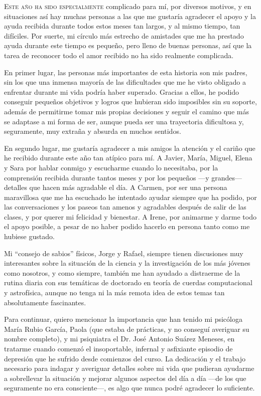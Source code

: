 \lettrine{E}{ste año ha sido especialmente} complicado para mí, por diversos motivos, y en situaciones así hay muchas personas a las que me gustaría agradecer el apoyo y la ayuda recibida durante todos estos meses tan largos, y al mismo tiempo, tan difíciles. Por suerte, mi círculo más estrecho de amistades que me ha prestado ayuda durante este tiempo es pequeño, pero lleno de buenas personas, así que la tarea de reconocer todo el amor recibido no ha sido realmente complicada. 

En primer lugar, las personas más importantes de esta historia son mis padres, sin los que una inmensa mayoría de las dificultades que me he visto obligado a enfrentar durante mi vida podría haber superado. Gracias a ellos, he podido conseguir pequeños objetivos y logros que hubieran sido imposibles sin su soporte, además de permitirme tomar mis propias decisiones y seguir el camino que más se adaptase a mi forma de ser, aunque pueda ser una trayectoria dificultosa y, seguramente, muy extraña y absurda en muchos sentidos.

En segundo lugar, me gustaría agradecer a mis amigos la atención y el cariño que he recibido durante este año tan atípico para mí. A Javier, María, Miguel, Elena y Sara por hablar conmigo y escucharme cuando lo necesitaba, por la comprensión recibida durante tantos meses y por los pequeños ---y grandes--- detalles que hacen más agradable el día. A Carmen, por ser una persona maravillosa que me ha escuchado he intentado ayudar siempre que ha podido, por las conversaciones y los paseos tan amenos y agradables después de salir de las clases, y por querer mi felicidad y bienestar. A Irene, por animarme y darme todo el apoyo posible, a pesar de no haber podido hacerlo en persona tanto como me hubiese gustado.

Mi \enquote{consejo de sabios} físicos, Jorge y Rafael, siempre tienen discusiones muy interesantes sobre la situación de la ciencia y la investigación de los más jóvenes como nosotros, y como siempre, también me han ayudado a distraerme de la rutina diaria con sus temáticas de doctorado en teoría de cuerdas computacional y astrofísica, aunque no tenga ni la más remota idea de estos temas tan absolutamente fascinantes. 

Para continuar, quiero mencionar la importancia que han tenido mi psicóloga María Rubio García, Paola (que estaba de prácticas, y no conseguí averiguar su nombre completo), y mi psiquiatra el Dr. José Antonio Suárez Meneses, en tratarme cuando comenzó el insoportable, infernal y asfixiante episodio de depresión que he sufrido desde comienzos del curso. La dedicación y el trabajo necesario para indagar y averiguar detalles sobre mi vida que pudieran ayudarme a sobrellevar la situación y mejorar algunos aspectos del día a día ---de los que seguramente no era consciente---, es algo que nunca podré agradecer lo suficiente.

